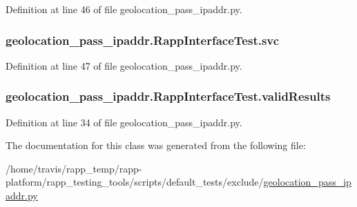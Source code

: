 Definition at line 46 of file geolocation\-\_\-pass\-\_\-ipaddr.\-py.

\hypertarget{classgeolocation__pass__ipaddr_1_1RappInterfaceTest_a6aae49924d451d3ff22c6c762aa7d731}{
\subsubsection[{svc}]{\setlength{\rightskip}{0pt plus 5cm}geolocation\-\_\-pass\-\_\-ipaddr.\-Rapp\-Interface\-Test.\-svc}}\label{classgeolocation__pass__ipaddr_1_1RappInterfaceTest_a6aae49924d451d3ff22c6c762aa7d731}


Definition at line 47 of file geolocation\-\_\-pass\-\_\-ipaddr.\-py.

\hypertarget{classgeolocation__pass__ipaddr_1_1RappInterfaceTest_ad65e3f03b0cef7e2bad147b08705faac}{
\subsubsection[{valid\-Results}]{\setlength{\rightskip}{0pt plus 5cm}geolocation\-\_\-pass\-\_\-ipaddr.\-Rapp\-Interface\-Test.\-valid\-Results}}\label{classgeolocation__pass__ipaddr_1_1RappInterfaceTest_ad65e3f03b0cef7e2bad147b08705faac}


Definition at line 34 of file geolocation\-\_\-pass\-\_\-ipaddr.\-py.



The documentation for this class was generated from the following file\-:\begin{DoxyCompactItemize}
\item 
/home/travis/rapp\-\_\-temp/rapp-\/platform/rapp\-\_\-testing\-\_\-tools/scripts/default\-\_\-tests/exclude/\hyperlink{geolocation__pass__ipaddr_8py}{geolocation\-\_\-pass\-\_\-ipaddr.\-py}\end{DoxyCompactItemize}
